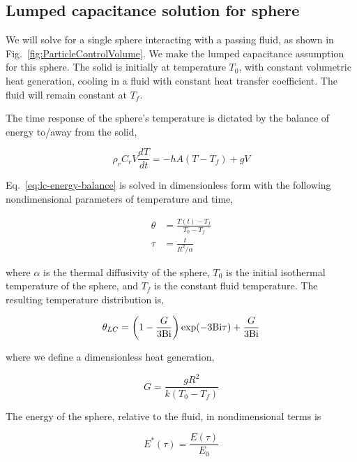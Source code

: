 \subsection{Lumped capacitance solution for sphere}\label{sec:lumped-capacitance}
We will solve for a single sphere interacting with a passing fluid, as shown in Fig.~\ref{fig:ParticleControlVolume}. We make the lumped capacitance assumption for this sphere. The solid is initially at temperature $T_0$, with constant volumetric heat generation, cooling in a fluid with constant heat transfer coefficient. The fluid will remain constant at $T_f$.

The time response of the sphere's temperature is dictated by the balance of energy to/away from the solid,  

\begin{equation}\label{eq:lc-energy-balance}
	\rho_rC_rV\frac{dT}{dt} = -hA(T-T_f) + gV
\end{equation}

Eq.~\ref{eq:lc-energy-balance} is solved in dimensionless form with the following nondimensional parameters of temperature and time,

\begin{subequations}
\begin{align}
    \theta &= \frac{T(t) - T_f}{T_0 - T_f}\\
    \tau & = \frac{t}{R^2/\alpha}
\end{align}
\end{subequations}

where $\alpha$ is the thermal diffusivity of the sphere, $T_0$ is the initial isothermal temperature of the sphere, and $T_f$ is the constant fluid temperature. The resulting temperature distribution is,

\begin{equation}
\label{eq:theta-lc}
	\theta_{LC}=\left(1-\frac{G}{3\mathrm{Bi}}\right)\exp(-3\mathrm{Bi} \tau) + \frac{G}{3\mathrm{Bi}}
\end{equation}

where we define a dimensionless heat generation,

\begin{equation}\label{eq:nondimensional-heat-generation}
	G = \frac{gR^2}{k(T_0 - T_f)}
\end{equation}

The energy of the sphere, relative to the fluid, in nondimensional terms is 

\begin{equation}
    E^*(\tau)=\frac{E(\tau)}{E_0}
\end{equation}

